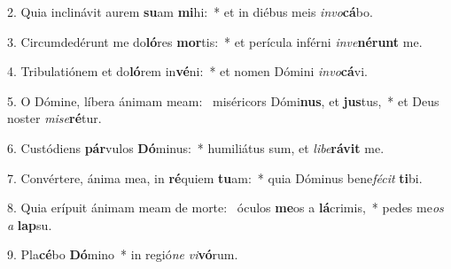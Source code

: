 2. Quia inclinávit aurem \textbf{su}am \textbf{mi}hi:~*  et in diébus meis \textit{in}\textit{vo}\textbf{cá}bo.\

3. Circumdedérunt me do\textbf{ló}res \textbf{mor}tis:~*  et perícula inférni \textit{in}\textit{ve}\textbf{né}\textbf{runt} me.\

4. Tribulatiónem et do\textbf{ló}rem in\textbf{vé}ni:~*  et nomen Dómini \textit{in}\textit{vo}\textbf{cá}vi.\

5. O Dómine, líbera ánimam meam: \dag\  miséricors Dómi\textbf{nus}, et \textbf{jus}tus,~*  et Deus noster \textit{mi}\textit{se}\textbf{ré}tur.\

6. Custódiens \textbf{pár}vulos \textbf{Dó}minus:~*  humiliátus sum, et \textit{li}\textit{be}\textbf{rá}\textbf{vit} me.\

7. Convértere, ánima mea, in \textbf{ré}quiem \textbf{tu}am:~*  quia Dóminus bene\textit{fé}\textit{cit} \textbf{ti}bi.\

8. Quia erípuit ánimam meam de morte: \dag\  óculos \textbf{me}os a \textbf{lá}crimis,~*  pedes me\textit{os} \textit{a} \textbf{lap}su.\

9. Pla\textbf{cé}bo \textbf{Dó}mino~*  in regió\textit{ne} \textit{vi}\textbf{vó}rum.\

